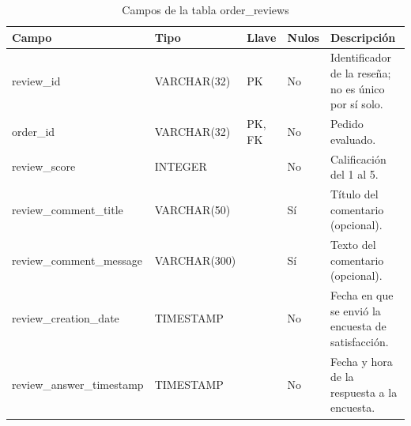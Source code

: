 \documentclass[a4paper,stu,12pt,donotrepeattitle,floatsintext]{apa7}
\begin{document}
{\footnotesize
\begin{longtable}{|>{\raggedright\arraybackslash}p{}|>{\raggedright\arraybackslash}p{}|>{\raggedright\arraybackslash}p{}|>{\raggedright\arraybackslash}p{}|>{\raggedright\arraybackslash}p{}|}
\caption{Campos de la tabla order\_reviews}\\
\hline
\textbf{Campo} & \textbf{Tipo} & \textbf{Llave} & \textbf{Nulos} & \textbf{Descripción} \\ \hline
\endhead
review\_\allowbreak{}id & VARCHAR(32) & PK & No & Identificador de la reseña; no es único por sí solo. \\ \hline
order\_\allowbreak{}id & VARCHAR(32) & PK, FK & No & Pedido evaluado. \\ \hline
review\_\allowbreak{}score & INTEGER &  & No & Calificación del 1 al 5. \\ \hline
review\_\allowbreak{}comment\_\allowbreak{}title & VARCHAR(50) &  & Sí & Título del comentario (opcional). \\ \hline
review\_\allowbreak{}comment\_\allowbreak{}message & VARCHAR(300) &  & Sí & Texto del comentario (opcional). \\ \hline
review\_\allowbreak{}creation\_\allowbreak{}date & TIMESTAMP &  & No & Fecha en que se envió la encuesta de satisfacción. \\ \hline
review\_\allowbreak{}answer\_\allowbreak{}timestamp & TIMESTAMP &  & No & Fecha y hora de la respuesta a la encuesta. \\ \hline
\end{longtable}
}
\end{document}
